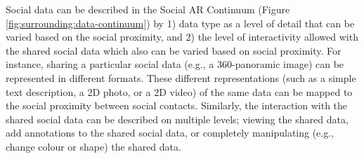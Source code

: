 



Social data can be described in the Social AR Continuum (Figure \ref{fig:surrounding:data-continuum}) by 1) data type as a level of detail that can be varied based on the social proximity, and 2) the level of interactivity allowed with the shared social data which also can be varied based on social proximity. For instance, sharing a particular social data (e.g., a 360-panoramic image) can be represented in different formats. These different representations (such as a simple text description, a 2D photo, or a 2D video) of the same data can be mapped to the social proximity between social contacts. Similarly, the interaction with the shared social data can be described on multiple levels; viewing the shared data, add annotations to the shared social data, or completely manipulating (e.g., change colour or shape) the shared data. 

